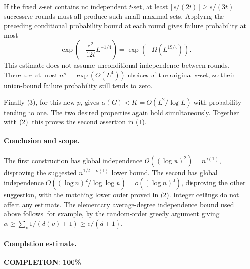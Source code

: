 If the fixed \(s\)-set contains no independent \(t\)-set,
at least \(\lfloor s/(2t)\rfloor\geq s/(3t)\) successive
rounds must all produce such small maximal sets.
Applying the preceding conditional probability bound at
each round gives failure probability at most
\[
 \exp\left(-\frac{s^2}{12t}L^{-1/4}\right)
 =\exp(-\Omega(L^{19/4})).
\]
This estimate does not assume unconditional independence
between rounds.
There are at most \(n^s=\exp(O(L^4))\) choices of the
original \(s\)-set, so their union-bound failure probability
still tends to zero.

Finally (3), for this new \(p\), gives
\(\alpha(G)<K=O(L^2/\log L)\) with probability tending
to one. The two desired properties again hold simultaneously.
Together with (2), this proves the second assertion in (1).

\paragraph{Conclusion and scope.}
The first construction has global independence
\(O((\log n)^2)=n^{o(1)}\), disproving the suggested
\(n^{1/2-o(1)}\) lower bound.
The second has global independence
\(O((\log n)^2/\log\log n)=o((\log n)^3)\), disproving
the other suggestion, with the matching lower order
proved in (2). Integer ceilings do not affect any estimate.
The elementary average-degree independence bound used above
follows, for example, by the random-order greedy argument
giving \(\alpha\geq\sum_v1/(d(v)+1)\geq v/(\bar d+1)\).

\paragraph{Completion estimate.}
\textbf{COMPLETION: 100\%}
